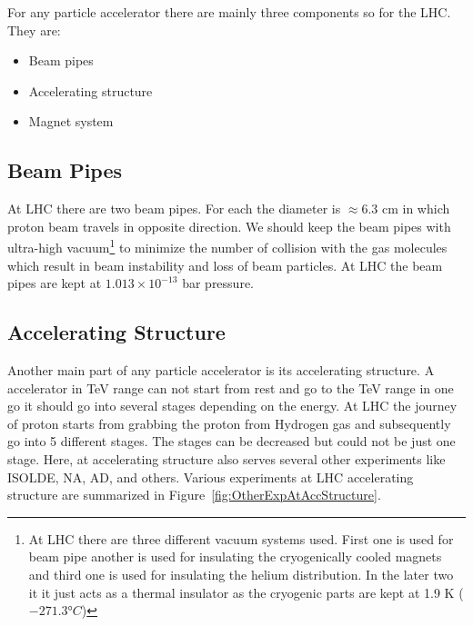 For any particle accelerator there are mainly three components so for the LHC. They are:
\begin{itemize}
  \item Beam pipes
  \item Accelerating structure
  \item Magnet system
\end{itemize}

\subsection{Beam Pipes} %
\label{sub:beam_pipes}

At LHC there are two beam pipes. For each the diameter is $\approx$6.3 cm in which proton beam travels in opposite direction. We should keep the beam pipes with ultra-high vacuum\footnote{At LHC there are three different vacuum systems used. First one is used for beam pipe another is used for insulating the cryogenically cooled magnets and third one is used for insulating the helium distribution. In the later two it it just acts as a thermal insulator as the cryogenic parts are kept at 1.9 K ($\ang{-271.3}C$)} to minimize the number of collision with the gas molecules which result in beam instability and loss of beam particles. At LHC the beam pipes are kept at $1.013 \times 10^{-13}$ bar pressure.

\subsection{Accelerating Structure} %
\label{sub:accelerating_structure}

Another main part of any particle accelerator is its accelerating structure. A accelerator in TeV range can not start from rest and go to the TeV range in one go it should go into several stages depending on the energy. At LHC the journey of proton starts from grabbing the proton from Hydrogen gas and subsequently go into 5 different stages. The stages can be decreased but could not be just one stage. Here, at accelerating structure also serves several other experiments like ISOLDE, NA, AD,  and others. Various experiments at LHC accelerating structure are summarized in Figure~\ref{fig:OtherExpAtAccStructure}. 

